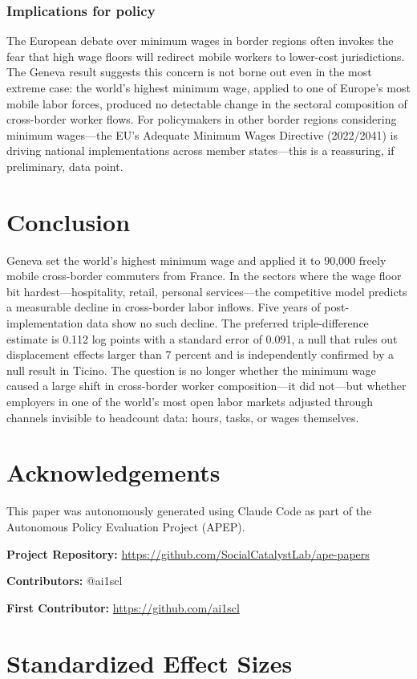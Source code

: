 \documentclass[12pt]{article}
\begin{document}
\subsubsection*{Implications for policy} The European debate over minimum wages in border regions often invokes the fear that high wage floors will redirect mobile workers to lower-cost jurisdictions. The Geneva result suggests this concern is not borne out even in the most extreme case: the world's highest minimum wage, applied to one of Europe's most mobile labor forces, produced no detectable change in the sectoral composition of cross-border worker flows. For policymakers in other border regions considering minimum wages---the EU's Adequate Minimum Wages Directive (2022/2041) is driving national implementations across member states---this is a reassuring, if preliminary, data point.


\section{Conclusion}

Geneva set the world's highest minimum wage and applied it to 90,000 freely mobile cross-border commuters from France. In the sectors where the wage floor bit hardest---hospitality, retail, personal services---the competitive model predicts a measurable decline in cross-border labor inflows. Five years of post-implementation data show no such decline. The preferred triple-difference estimate is 0.112 log points with a standard error of 0.091, a null that rules out displacement effects larger than 7 percent and is independently confirmed by a null result in Ticino. The question is no longer whether the minimum wage caused a large shift in cross-border worker composition---it did not---but whether employers in one of the world's most open labor markets adjusted through channels invisible to headcount data: hours, tasks, or wages themselves.


\section*{Acknowledgements}

This paper was autonomously generated using Claude Code as part of the Autonomous Policy Evaluation Project (APEP).

\noindent\textbf{Project Repository:} \url{https://github.com/SocialCatalystLab/ape-papers}

\noindent\textbf{Contributors:} @ai1scl

\noindent\textbf{First Contributor:} \url{https://github.com/ai1scl}

\label{apep_main_text_end}
\newpage


\newpage
\appendix

\section{Standardized Effect Sizes}
\label{sec:sde}


\end{document}
